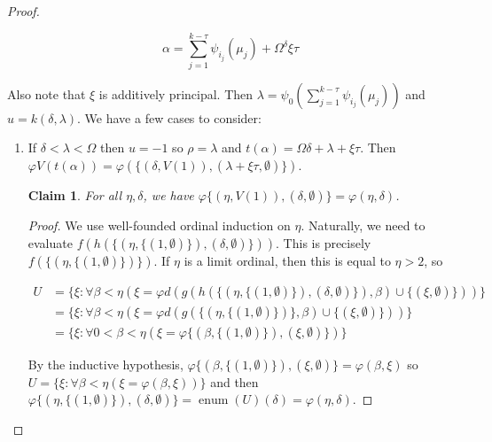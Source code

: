 \documentclass{article}
\theoremstyle{definition}
\theoremstyle{plain}
\theoremstyle{plain}
\theoremstyle{plain}
\theoremstyle{plain}
\theoremstyle{remark}
\theoremstyle{remark}
\theoremstyle{remark}
\theoremstyle{plain}
\theoremstyle{plain}
\newtheorem{claim}[definition]{Claim}
\begin{document}
\begin{proof}
\begin{enumerate}
\begin{enumerate}
\begin{enumerate}
            \begin{equation}
            \alpha = \sum_{j = 1}^{k-\tau} \psi_{i_j}(\mu_j) + \Omega^\delta \xi \tau
            \end{equation}
            
            Also note that $\xi$ is additively principal. Then $\lambda = \psi_0\left(\sum_{j = 1}^{k-\tau} \psi_{i_j}(\mu_j)\right)$ and $u = k(\delta, \lambda)$. We have a few cases to consider:
        
            \begin{enumerate}
                \item If $\delta < \lambda < \Omega$ then $u = -1$ so $\rho = \lambda$ and $t(\alpha) = \Omega \delta + \lambda + \xi \tau$. Then $\varphi V(t(\alpha)) = \varphi (\{(\delta, V(1)), (\lambda + \xi \tau, \emptyset)\})$. 
        
                \begin{claim}
                For all $\eta, \delta$, we have $\varphi \{(\eta, V(1)), (\delta, \emptyset)\} = \varphi(\eta, \delta)$.
                \end{claim}
            
                \begin{proof}
                We use well-founded ordinal induction on $\eta$. Naturally, we need to evaluate $f(h(\{(\eta, \{(1,\emptyset)\}), (\delta, \emptyset)\}))$. This is precisely $f(\{(\eta, \{(1,\emptyset)\})\})$. If $\eta$ is a limit ordinal, then this is equal to $\eta > 2$, so
            
                \begin{equation}
                \begin{split}
                U & = \{\xi: \forall \beta < \eta (\xi=\varphi d(g(h(\{(\eta, \{(1,\emptyset)\}), (\delta, \emptyset)\}),\beta) \cup \{(\xi, \emptyset)\}))\} \\ & = \{\xi: \forall \beta < \eta (\xi=\varphi d(g(\{(\eta, \{(1,\emptyset)\})\},\beta) \cup \{(\xi, \emptyset)\}))\} \\ & = \{\xi: \forall 0 < \beta < \eta (\xi=\varphi \{(\beta, \{(1,\emptyset)\}), (\xi, \emptyset)\})\}
                \end{split}
                \end{equation}
            
                By the inductive hypothesis, $\varphi \{(\beta, \{(1,\emptyset)\}), (\xi, \emptyset)\} = \varphi(\beta,\xi)$ so $U = \{\xi: \forall \beta < \eta (\xi=\varphi(\beta,\xi))\}$ and then $\varphi \{(\eta, \{(1,\emptyset)\}), (\delta, \emptyset)\} = \operatorname{enum}(U)(\delta) = \varphi(\eta, \delta)$.
            

\end{proof}
\end{enumerate}
\end{enumerate}
\end{enumerate}
\end{enumerate}
\end{proof}
\end{document}
